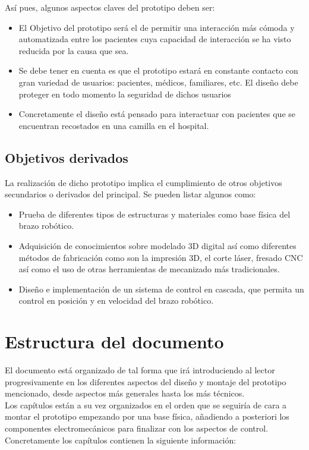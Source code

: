 Así pues, algunos aspectos claves del prototipo deben ser:
\begin{itemize}
    \item El Objetivo del prototipo será el de permitir una interacción más cómoda y automatizada entre los pacientes cuya capacidad de interacción se ha visto reducida por la causa que sea.
    \item Se debe tener en cuenta es que el prototipo estará en constante contacto con gran variedad de usuarios: pacientes, médicos, familiares, etc. El diseño debe proteger en todo momento la seguridad de dichos usuarios
    \item Concretamente el diseño está pensado para interactuar con pacientes que se encuentran recostados en una camilla en el hospital.
\end{itemize}

\subsection{Objetivos derivados}

La realización de dicho prototipo implica el cumplimiento de otros objetivos secundarios o derivados del principal. Se pueden listar algunos como:
\begin{itemize}
    \item Prueba de diferentes tipos de estructuras y materiales como base física del brazo robótico.
    \item Adquisición de conocimientos sobre modelado 3D digital así como diferentes métodos de fabricación como son la impresión 3D, el corte láser, fresado CNC así como el uso de otras herramientas de mecanizado más tradicionales.
    \item Diseño e implementación de un sistema de control en cascada, que permita un control en posición y en velocidad del brazo robótico.
\end{itemize}


\section{Estructura del documento}

El documento está organizado de tal forma que irá introduciendo al lector progresivamente en los diferentes aspectos del diseño y montaje del prototipo mencionado, desde aspectos más generales hasta los más técnicos.
\\

Los capítulos están a su vez organizados en el orden que se seguiría de cara a montar el prototipo empezando por una base física, añadiendo a posteriori los componentes electromecánicos para finalizar con los aspectos de control. Concretamente los capítulos contienen la siguiente información:

